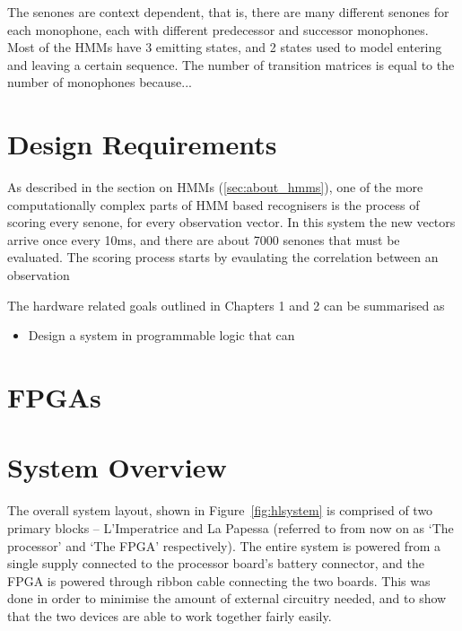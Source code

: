 	The senones are context dependent, that is, there are many different senones for each monophone, each with different predecessor and successor monophones.  Most of the HMMs have 3 emitting states, and 2 states used to model entering and leaving a certain sequence. The number of transition matrices is equal to the number of monophones because...

\section{Design Requirements} %
\label{sec:design_requirements}
	As described in the section on HMMs (\ref{sec:about_hmms}), one of the more computationally complex parts of HMM based recognisers is the process of scoring every senone, for every observation vector.  In this system the new vectors arrive once every 10ms, and there are about 7000 senones that must be evaluated.  The scoring process starts by evaulating the correlation between an observation 

	The hardware related goals outlined in Chapters 1 and 2 can be summarised as
	\begin{itemize}
		\item Design a system in programmable logic that can 
	\end{itemize}


\section{FPGAs} %
\label{sec:fpgas}



\section{System Overview} %
\label{sec:system_overview}

	The overall system layout, shown in Figure~\ref{fig:hlsystem} is comprised of two primary blocks -- L'Imperatrice and La Papessa (referred to from now on as `The processor' and `The FPGA' respectively). The entire system is powered from a single supply connected to the processor board's battery connector, and the FPGA is powered through ribbon cable connecting the two boards.  This was done in order to minimise the amount of external circuitry needed, and to show that the two devices are able to work together fairly easily.

